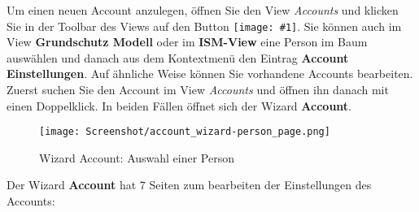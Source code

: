 \documentclass[a4paper,10pt]{book}
\newcommand{\icon}[1]{\texttt{[image: \#1]}}
\begin{document}
Um einen neuen Account anzulegen, öffnen Sie den View \textit{Accounts} und
klicken Sie in der Toolbar des Views auf den Button
\icon{Icon/user_add.png}. Sie können auch im View
\textbf{Grundschutz Modell} oder im \textbf{ISM-View} eine Person im Baum
auswählen und danach aus dem Kontextmenü den Eintrag \textbf{Account
Einstellungen}. Auf ähnliche Weise können Sie vorhandene Accounts bearbeiten.
Zuerst suchen Sie den Account im View \textit{Accounts} und öffnen ihn danach
mit einen Doppelklick. In beiden Fällen öffnet sich der Wizard \textbf{Account}.

\begin{figure}[htb!]
  \centering
  \texttt{[image: Screenshot/account\_wizard-person\_page.png]}
  \caption{\label{Wizard Account: Auswahl einer Person} Wizard Account: Auswahl einer Person}
\end{figure}

Der Wizard \textbf{Account} hat 7 Seiten zum bearbeiten der Einstellungen des Accounts:
\end{document}
